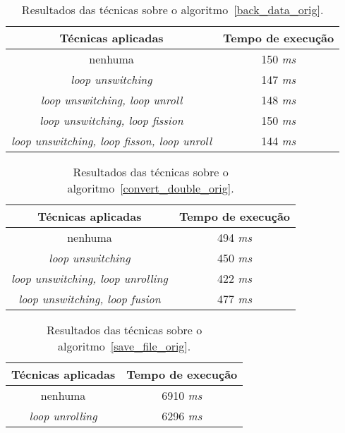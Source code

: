 \documentclass[12pt]{article}
\begin{document}
\begin{table}[H]
  \caption{Resultados das técnicas sobre o algoritmo~\ref{back_data_orig}.}
  \label{tabela_back_data}
\begin{center}
  \begin{tabular}{|c|c|}
    \hline
    Técnicas aplicadas & Tempo de execução\\
    \hline
    nenhuma & 150 \textit{ms} \\
    \hline
     \textit{loop unswitching} & 147 \textit{ms} \\
    \hline
     \textit{loop unswitching, loop unroll} & 148 \textit{ms} \\
    \hline
     \textit{loop unswitching, loop fission} & 150 \textit{ms} \\
    \hline
    \textit{loop unswitching, loop fisson, loop unroll} & 144 \textit{ms} \\
    \hline
  \end{tabular}
\end{center}
\end{table}

\begin{table}[H]
  \caption{Resultados das técnicas sobre o algoritmo~\ref{convert_double_orig}.}
  \label{tabela_convert_double}
\begin{center}
  \begin{tabular}{|c|c|}
    \hline
 Técnicas aplicadas & Tempo de execução\\
    \hline
    nenhuma & 494 \textit{ms} \\
    \hline
     \textit{loop unswitching} & 450 \textit{ms} \\
    \hline
    \textit{loop unswitching, loop unrolling}& 422 \textit{ms} \\
    \hline
    \textit{loop unswitching, loop fusion} & 477 \textit{ms} \\
    \hline
  \end{tabular}
\end{center}
\end{table}

\begin{table}[H]
  \caption{Resultados das técnicas sobre o algoritmo~\ref{save_file_orig}.}
  \label{tabela_save_file}
\begin{center}
  \begin{tabular}{|c|c|}
    \hline
    Técnicas aplicadas & Tempo de execução\\
    \hline
    nenhuma & 6910 \textit{ms} \\
    \hline
    \textit{loop unrolling} & 6296 \textit{ms} \\
    \hline
  \end{tabular}
\end{center}
\end{table}
\end{document}
